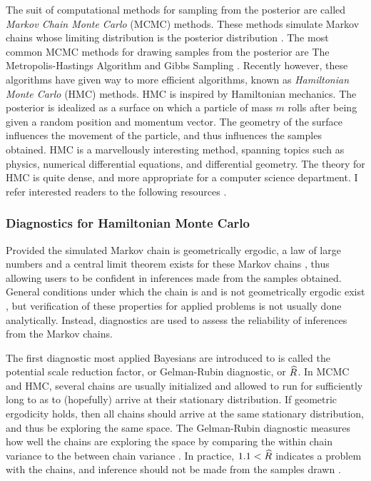 The suit of computational methods for sampling from the posterior are called \textit{Markov Chain Monte Carlo} (MCMC) methods.  These methods simulate Markov chains whose limiting distribution is the posterior distribution \cite{livingstone2016geometric}.  The most common MCMC methods for drawing  samples from the posterior are The Metropolis-Hastings Algorithm and Gibbs Sampling \cite{gelman2013bayesian,mcelreath2016statistical}.  Recently however, these algorithms have given way to more efficient algorithms, known as \textit{Hamiltonian Monte Carlo} (HMC) methods.  HMC is inspired by Hamiltonian mechanics. The posterior is idealized as a surface on which a particle of mass $ m $ rolls after being given a random position and momentum vector.  The geometry of the surface influences the movement of the particle, and thus influences the samples obtained.  HMC is a marvellously interesting method, spanning topics such as physics, numerical differential equations, and differential geometry.  The theory for HMC is quite dense, and more appropriate for a computer science department.  I refer interested readers to the following resources \cite{ gelman2013bayesian, livingstone2016geometric, mcelreath2016statistical,neal2011mcmc, hoffman2014no,betancourt2017conceptual}.

\subsubsection{Diagnostics for Hamiltonian Monte Carlo}

Provided the simulated Markov chain is geometrically ergodic, a law of large numbers and a central limit theorem exists for these Markov chains \cite{livingstone2016geometric, betancourt2017robust}, thus allowing users to be confident in inferences made from the samples obtained.  General conditions under which the chain is and is not geometrically ergodic exist \cite{livingstone2016geometric}, but verification of these properties for applied problems is not usually done analytically.  Instead, diagnostics are used to assess the reliability of inferences from the Markov chains.

The first diagnostic most applied Bayesians are introduced to is called the potential scale reduction factor, or Gelman-Rubin diagnostic, or $ \widehat{R}$.    In MCMC and HMC, several chains are usually initialized and allowed to run for sufficiently long to as to (hopefully) arrive at their stationary distribution.  If geometric ergodicity holds, then all chains should arrive at the same stationary distribution, and thus be exploring the same space.  The Gelman-Rubin diagnostic  measures how well the chains are exploring the space by comparing the within chain variance to the between chain variance \cite{gelman2013bayesian}.  In practice, $ 1.1<\widehat{R} $ indicates a problem with the chains, and inference should not be made from the samples drawn \cite{betancourt2017robust}.

